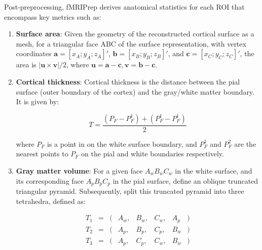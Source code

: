 \documentclass{cys}
\begin{document}
\bigskip
Post-preprocessing, fMRIPrep derives anatomical statistics for each ROI that encompass key metrics such as:

\begin{enumerate}


\item \textbf{Surface area}: Given the geometry of the reconstructed cortical surface as a mesh, for a triangular face ABC of the surface representation, with vertex coordinates $\mathbf{a}=[x_A ; y_A ; z_A]'$, $\mathbf{b}=[x_B ; y_B ; z_B]'$, and $\mathbf{c}=[x_C ; y_C ; z_C]'$, the area is $|\mathbf{u} \times \mathbf{v}|/2$, where $\mathbf{u} = \mathbf{a}-\mathbf{c}, \mathbf{v} = \mathbf{b}-\mathbf{c}$.
\\
\item \textbf{Cortical thickness}: Cortical thickness is the distance between the pial surface (outer boundary of the cortex) and the gray/white matter boundary. It is given by: 

\begin{equation}
T=\frac{(P_F-P_F^1)+(P_F^1-P_F^1)}{2}
\end{equation}

where $P_F$ is a point in on the white surface boundary, and $P_F^1$ and $P_F^2$ are the nearest points to $P_F$ on the pial and white boundaries respectively. 
\\
\item \textbf{Gray matter volume}: For a given face $A_w B_w C_w$ in the white surface, and its corresponding face $A_p B_p C_p$ in the pial surface, define an oblique truncated triangular pyramid. Subsequently, split this truncated pyramid into three tetrahedra, defined as:

\[
\begin{array}{lcllllll} 
T_1 &=& (&A_w,&B_w,&C_w,&A_p&)\\ 
T_2 &=& (&A_p,&B_p,&C_p,&B_w&)\\ 
T_3 &=& (&A_p,&C_p,&C_w,&B_w&)
\end{array}
\]


\end{enumerate}
\end{document}
